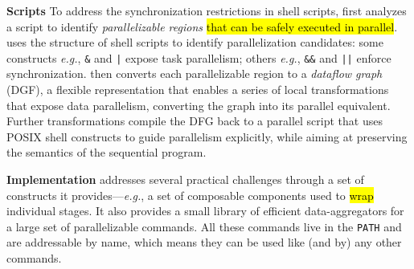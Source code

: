 \documentclass[letterpaper,twocolumn,10pt]{article}
\newcommand{\eg}{{\em e.g.}, }
\newcommand{\heading}[1]{\vspace{4pt}\noindent\textbf{#1}\enspace}
\newcommand{\ttt}[1]{\texttt{#1}}
\newcommand{\todo}[1]{\hl{#1}\xspace}
\newcommand{\kk}[1]{[{\color{magenta}kk: #1}]}
\begin{document}
\heading{Scripts}
To address the synchronization restrictions in shell scripts, \sys first analyzes a script to identify \emph{parallelizable regions} \todo{that can be safely executed in parallel}.
\sys uses the structure of shell scripts to identify parallelization candidates:
  some constructs \eg \ttt{\&} and \ttt{|} expose task parallelism; others \eg \ttt{\&\&} and \ttt{||} enforce synchronization.
\sys then converts each parallelizable region to a \emph{dataflow graph} (DGF), 
  a flexible representation that enables a series of local transformations that expose data parallelism, converting the graph into its parallel equivalent.
Further transformations compile the DFG back to a parallel script that uses POSIX shell constructs to guide parallelism explicitly, while aiming at preserving the semantics of the sequential program.

\heading{Implementation}
\sys addresses several practical challenges through a set of constructs it provides---\eg a set of
composable components used to \todo{wrap} individual stages.
It also provides a small library of efficient data-aggregators for a large set of parallelizable commands.
All these commands live in the \ttt{PATH} and are addressable by name, which means they can be used like (and by) any other commands.
\end{document}
